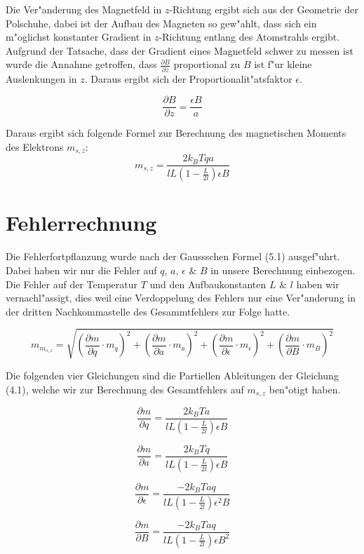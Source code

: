 \documentclass[a4paper,parskip,11pt, DIV12]{scrreprt}
\begin{document}
Die Ver"anderung des Magnetfeld in $z$-Richtung ergibt sich aus der Geometrie der Polschuhe, dabei ist der Aufbau des Magneten so gew"ahlt, dass sich ein m"oglichst konstanter Gradient in $z$-Richtung entlang des Atomstrahls ergibt. Aufgrund der Tatsache, dass der Gradient eines Magnetfeld schwer zu messen ist wurde die Annahme getroffen, dass $\frac{ \partial B}{ \partial z}$ proportional zu $B$ ist f"ur kleine Auslenkungen in $z$. Daraus ergibt sich der Proportionalit"atsfaktor $\epsilon$.

\begin{equation}
\frac{\partial B}{\partial z}=\frac{\epsilon B}{a}
\end{equation}

Daraus ergibt sich folgende Formel zur Berechnung des magnetischen Moments des Elektrons $m_{s,z}$:
\begin{equation}
m_{s,z}=\frac{2k_BTqa}{lL(1-\frac{L}{2l})\epsilon B}
\end{equation}


\clearpage

\chapter{Fehlerrechnung}
Die Fehlerfortpflanzung wurde nach der Gaussschen Formel (5.1) ausgef"uhrt. Dabei haben wir nur die Fehler auf $q$, $a$, $\epsilon$ $\&$ $B$ in unsere Berechnung einbezogen. Die Fehler auf der Temperatur $T$ und den Aufbaukonstanten $L$ $\&$ $l$ haben wir vernachl"assigt, dies weil eine Verdoppelung des Fehlers nur eine Ver"anderung in der dritten Nachkommastelle des Gesammtfehlers zur Folge hatte.


\begin{equation}
m_{m_{s,z}}=\sqrt{(\frac{\partial m}{\partial q} \cdot m_q)^2+(\frac{\partial m}{\partial a} \cdot m_a)^2+(\frac{\partial m}{\partial \epsilon} \cdot m_\epsilon)^2+(\frac{\partial m}{\partial B} \cdot m_B)^2}
\end{equation}

Die folgenden vier Gleichungen sind die Partiellen Ableitungen der Gleichung (4.1), welche wir zur Berechnung des Gesamtfehlers auf $m_{s,z}$ ben"otigt haben.

\begin{equation}
\frac{\partial m}{\partial q} = \frac{2k_BTa}{lL(1-\frac{L}{2l})\epsilon B}
\end{equation}

\begin{equation}
\frac{\partial m}{\partial a} = \frac{2k_BTq}{lL(1-\frac{L}{2l})\epsilon B}
\end{equation}

\begin{equation}
\frac{\partial m}{\partial \epsilon} = \frac{-2k_BTaq}{lL(1-\frac{L}{2l})\epsilon^2 B}
\end{equation}

\begin{equation}
\frac{\partial m}{\partial B} = \frac{-2k_BTaq}{lL(1-\frac{L}{2l})\epsilon B^2}
\end{equation}


\clearpage
 

\end{document}
